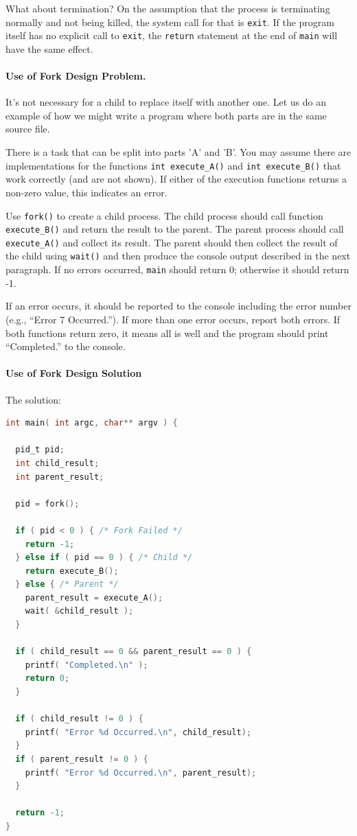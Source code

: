 What about termination? On the assumption that the process is terminating normally and not being killed, the system call for that is \texttt{exit}. If the program itself has no explicit call to \texttt{exit}, the \texttt{return} statement at the end of \texttt{main} will have the same effect.

\paragraph{Use of Fork Design Problem. }
It's not necessary for a child to replace itself with another one. Let us do an example of how we might write a program where both parts are in the same source file.

There is a task that can be split into parts 'A' and 'B'. You may assume there are implementations for the functions \texttt{int execute\_A()} and \texttt{int execute\_B()} that work correctly (and are not shown). If either of the execution functions returns a non-zero value, this indicates an error.

Use \texttt{fork()} to create a child process. The child process should call function \texttt{execute\_B()} and return the result to the parent. The parent process should call \texttt{execute\_A()} and collect its result. The parent should then collect the result of the child using \texttt{wait()} and then produce the console output described in the next paragraph. If no errors occurred, \texttt{main} should return 0; otherwise it should return -1.

If an error occurs, it should be reported to the console including the error number (e.g., ``Error 7 Occurred.''). If more than one error occurs, report both errors. If both functions return zero, it means all is well and the program should print ``Completed.'' to the console.

\paragraph{Use of Fork Design Solution} The solution:

\begin{lstlisting}[language=C]
int main( int argc, char** argv ) {

  pid_t pid;
  int child_result;
  int parent_result;

  pid = fork();
  
  if ( pid < 0 ) { /* Fork Failed */
    return -1;
  } else if ( pid == 0 ) { /* Child */
    return execute_B();
  } else { /* Parent */ 
    parent_result = execute_A();
    wait( &child_result );
  }
  
  if ( child_result == 0 && parent_result == 0 ) {
    printf( "Completed.\n" );
    return 0;
  }
  
  if ( child_result != 0 ) {
    printf( "Error %d Occurred.\n", child_result);
  }
  if ( parent_result != 0 ) {
    printf( "Error %d Occurred.\n", parent_result);
  }
  
  return -1;
}
\end{lstlisting}


